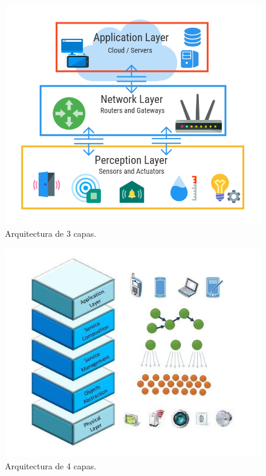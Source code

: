 {\begin{figure}[hb!]
    \centering
    \includegraphics[width=\linewidth]{imagenes/arch-3-layer.png}
    \caption{Arquitectura de 3 capas. \cite{fig-3-layer-arch}}
    \label{fig:figure1}
\end{figure}

\begin{figure}[ht!]
    \centering
    \includegraphics[width=\linewidth]{imagenes/SOA-based-architecture-for-IoT-middleware-1.jpg}
    \caption{Arquitectura de 4 capas. \cite{fig-4-layer-arch}}
    \label{fig:figure2}
\end{figure}


}
